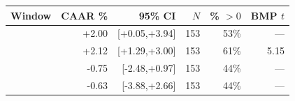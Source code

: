 \begin{tabular}{lrrrrr}
\toprule
Window & CAAR \% & 95\% CI & $N$ & \% $>0$ & BMP $t$ \\
\midrule
[-10,+10] & +2.00 & [+0.05,+3.94] & 153 & 53\% & — \\
[+0,+1] & +2.12 & [+1.29,+3.00] & 153 & 61\% & 5.15 \\
[+2,+20] & -0.75 & [-2.48,+0.97] & 153 & 44\% & — \\
[+2,+60] & -0.63 & [-3.88,+2.66] & 153 & 44\% & — \\
\bottomrule
\end{tabular}